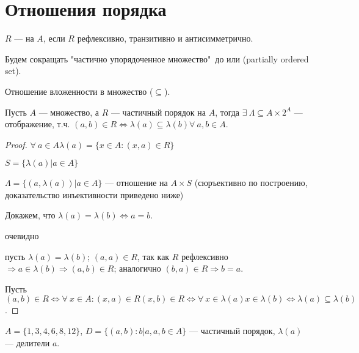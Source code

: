 \section{Отношения порядка}\label{sec:ch-2-sec-4}


\begin{definition}
    $R$ ---  на $A$, если $R$ рефлексивно, транзитивно и антисимметрично.
\end{definition}

\begin{sh-designation}
    Будем сокращать "частично упорядоченное множество"\ до  или  (partially ordered set).
\end{sh-designation}

\begin{sh-example}
    Отношение вложенности в множество ($\subseteq$).
\end{sh-example}

\begin{theorem}
    Пусть $A$ --- множество, а $R$ --- частичный порядок на $A$, тогда $\exists ~\Lambda \subseteq A \times 2^A$ --- отображение, т.ч. $(a, b) \in R \Leftrightarrow \lambda(a) \subseteq \lambda(b) \forall ~a, b \in A$.
\end{theorem}

\begin{proof}
    $\forall ~a \in A \lambda(a) = \{x \in A : (x, a) \in R\}$

    \quad $S = \{\lambda(a) | a \in A\}$

    \quad $\Lambda = \{(a, \lambda(a)) | a \in A\}$ --- отношение на $A \times S$ (сюръективно по построению, доказательство инъективности приведено ниже)

    Докажем, что $\lambda(a) = \lambda(b) \Leftrightarrow a = b$.

    \fbox{$\Leftarrow$} очевидно

    \fbox{$\Rightarrow$} пусть $\lambda(a) = \lambda(b)$; $(a, a) \in R$, так как $R$ рефлексивно $\Rightarrow a \in \lambda(b) \Rightarrow (a, b) \in R$; аналогично $(b, a) \in R \Rightarrow b = a$.

    Пусть $(a, b) \in R \Leftrightarrow \forall ~x \in A: (x, a) \in R (x, b) \in R \Leftrightarrow \forall ~x \in \lambda(a) x \in \lambda(b) \Leftrightarrow \lambda(a) \subseteq \lambda(b)$.
\end{proof}


\begin{sh-example}
    $A = \{1, 3, 4, 6, 8, 12\}$, $D = \{(a, b): b | a, a, b \in A\}$ --- частичный порядок, $\lambda(a)$ --- делители $a$.
\end{sh-example}

